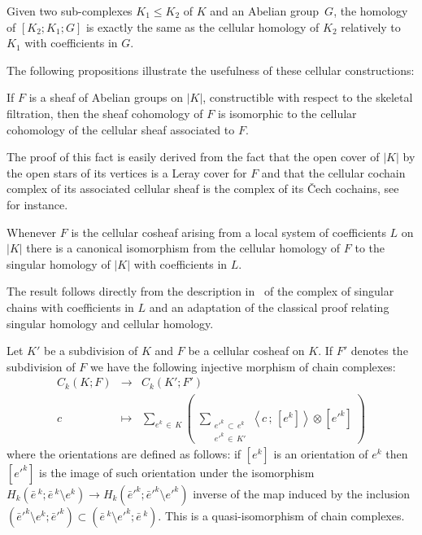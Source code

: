 \documentclass[AHL,Unicode,longabstracts,published]{cedram}
\begin{document}
\begin{exam}
Given two sub-complexes $K_1\leq K_2$ of $K$ and an Abelian group~$G$, the homology of $[K_2;K_1;G]$ is exactly the same as the cellular homology of $K_2$ relatively to $K_1$ with coefficients in $G$.
\end{exam}

The following propositions illustrate the usefulness of these cellular constructions:

\begin{prop}
If $F$ is a sheaf of Abelian groups on $|K|$, constructible with respect to the skeletal filtration, then the sheaf cohomology of $F$ is isomorphic to the cellular cohomology of the cellular sheaf associated to $F$.
\end{prop}

The proof of this fact is easily derived from the fact that the open cover of $|K|$ by the open stars of its vertices is a Leray cover for $F$ and that the cellular cochain complex of its associated cellular sheaf is the complex of its \v Cech cochains, see~\cite[Théorème~5.10.1 p.~228]{God_top_alg}
for instance.

\begin{prop}
Whenever $F$ is the cellular cosheaf arising from a local system of coefficients $L$ on $|K|$ there is a canonical isomorphism from the cellular homology of $F$ to the singular homology of $|K|$ with coefficients in $L$.
\end{prop}

The result follows directly from the description in~\cite[Section~3.H. Local Coefficients pp.~327-337.]{Hat_alg_top}
of the complex of singular chains with coefficients in $L$ and an adaptation of the classical proof relating singular homology and cellular homology.

\begin{prop}
Let $K'$ be a subdivision of $K$ and $F$ be a cellular cosheaf on $K$. If $F'$ denotes the subdivision of $F$ we have the following injective morphism of chain complexes:
\begin{equation*}
\begin{array}{rcl}
C_k(K;F) & \longrightarrow & C_k(K';F') \\%
c & \longmapsto & \displaystyle \sum_{e^k\,\in\,K} \left(\;\sum_{\substack{e'^k\,\subset\,e^k\\ e'^k\,\in\,K'}} \left\langle c\,;\,[e^k]\right\rangle\otimes [e'^k]\; \right)
\end{array}
\end{equation*}
where the orientations are defined as follows: if $[e^k]$ is an orientation of $e^k$ then $[e'^k]$ is the image of such orientation under the isomorphism $H_k(\bar{e}\,^k;\bar{e}\,^k\setminus e^k)\rightarrow H_k(\bar{e}'^k;\bar{e}'^k\setminus e'^k)$ inverse of the map induced by the inclusion $({\bar{e}'^k\setminus e^k};\bar{e}'^k)\subset(\bar{e}\,^k\setminus e'^k;\bar{e}\,^k)$. This is a quasi-isomorphism of chain complexes.
\end{prop}
\end{document}
